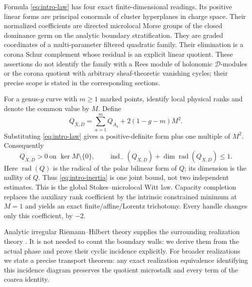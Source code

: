 \documentclass[11pt,a4paper]{amsart}
\theoremstyle{plain}
\theoremstyle{definition}
\newcommand{\indm}{\operatorname{ind}_{-}}
\newcommand{\Rad}{\operatorname{rad}}
\begin{document}
Formula \eqref{eq:intro-law} has four exact finite-dimensional readings.  Its positive linear
forms are principal conormals of cluster hyperplanes in charge space.  Their normalized
coefficients are directed microlocal Morse groups of the closed dominance germ on the analytic
boundary stratification.  They are graded coordinates of a multi-parameter filtered quadratic
family.  Their elimination is a corona Schur complement whose residual is an explicit linear
quotient.  These assertions do not identify the family with a Rees module of holonomic
$\mathcal D$-modules or the corona quotient with arbitrary sheaf-theoretic vanishing cycles; their
precise scope is stated in the corresponding sections.

For a genus-$g$ curve with $m\geq1$ marked points, identify local physical ranks and denote the
common value by $M$.  Define
\begin{equation}\label{eq:intro-fusion}
                      Q_{X,D}=\sum_{a=1}^{m}Q_{A_a}+2(1-g-m)M^2.
\end{equation}
Substituting \eqref{eq:intro-law} gives a positive-definite form plus one multiple of $M^2$.
Consequently
\begin{equation}\label{eq:intro-inertia}
 Q_{X,D}>0\ \text{on }\ker M\setminus\{0\},\qquad
 \indm(Q_{X,D})+\dim\Rad(Q_{X,D})\leq1.
\end{equation}
Here $\Rad(Q)$ is the radical of the polar bilinear form of $Q$; its dimension is the nullity of
$Q$.  Thus \eqref{eq:intro-inertia} is one joint bound, not two independent estimates.  This is
the global Stokes--microlocal Witt law.  Capacity completion replaces the auxiliary rank
coefficient by the intrinsic constrained minimum at $M=1$ and yields an exact
finite/affine/Lorentz trichotomy.  Every handle changes only this coefficient, by $-2$.

Analytic irregular Riemann--Hilbert theory supplies the surrounding realization theory
\cite{Sabbah,DKRH}.  It is not needed to count the boundary walls: we derive them from the actual
phase and prove their cyclic incidence explicitly.  For broader realizations we state a precise
transport theorem: any exact realization equivalence identifying this incidence diagram preserves
the quotient microstalk and every term of the coarea identity.
\end{document}
